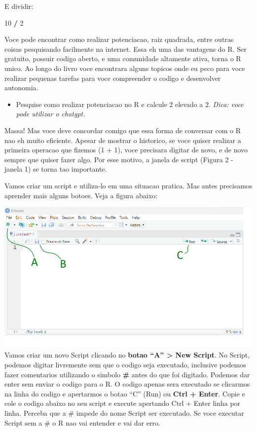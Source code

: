 \documentclass[
]{book}
\newenvironment{Shaded}{\begin{snugshade}}{\end{snugshade}}
\newcommand{\DecValTok}[1]{\textcolor[rgb]{0.00,0.00,0.81}{#1}}
\newcommand{\SpecialCharTok}[1]{\textcolor[rgb]{0.81,0.36,0.00}{\textbf{#1}}}
\providecommand{\tightlist}{%
  \setlength{\itemsep}{0pt}\setlength{\parskip}{0pt}}
\begin{document}
E dividir:

\begin{Shaded}
\begin{Highlighting}[]
\DecValTok{10} \SpecialCharTok{/} \DecValTok{2}
\end{Highlighting}
\end{Shaded}

Voce pode encontrar como realizar potenciacao, raiz quadrada, entre outras coisas pesquisando facilmente na internet. Essa eh uma das vantagens do R. Ser gratuito, possuir codigo aberto, e uma comunidade altamente ativa, torna o R unico. Ao longo do livro voce encontrara alguns topicos onde eu peco para voce realizar pequenas tarefas para voce compreender o codigo e desenvolver autonomia.

\begin{itemize}
\tightlist
\item
  Pesquise como realizar potenciacao no R e calcule 2 elevado a 2.
  \emph{Dica: voce pode utilizar o chatgpt.}
\end{itemize}

Massa! Mas voce deve concordar comigo que essa forma de conversar com o R nao eh muito eficiente. Apesar de mostrar o historico, se voce quiser realizar a primeira operacao que fizemos (1 + 1), voce precisara digitar de novo, e de novo sempre que quiser fazer algo. Por esse motivo, a janela de script (Figura 2 - janela 1) se torna tao importante.

Vamos criar um script e utiliza-lo em uma situacao pratica. Mas antes precisamos aprender mais alguns botoes. Veja a figura abaixo:

\includegraphics{img/Figura3_script.png}
Vamos criar um novo Script clicando no \textbf{botao ``A'' \textgreater{} New Script}. No Script, podemos digitar livremente sem que o codigo seja executado, inclusive podemos fazer comentarios utilizando o simbolo \textbf{\#} antes do que foi digitado. Podemos dar enter sem enviar o codigo para o R. O codigo apenas sera executado se clicarmos na linha do codigo e apertarmos o botao ``C'' (Run) ou \textbf{Ctrl + Enter}. Copie e cole o codigo abaixo no seu script e execute apertando Ctrl + Enter linha por linha. Perceba que a \# impede do nome Script ser executado. Se voce executar Script sem a \# o R nao vai entender e vai dar erro.
\end{document}
